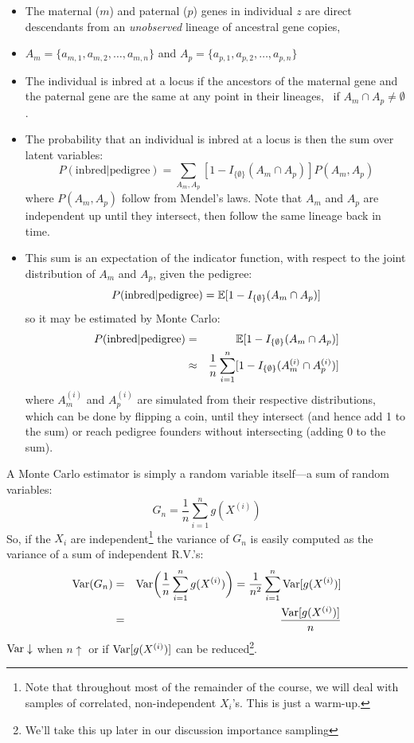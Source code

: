 \begin{itemize}
\item The maternal ($m$) and paternal ($p$) genes in individual $z$ are direct descendants from an {\em unobserved} lineage of ancestral gene copies, \ie
\item $A_m = \{a_{m,1}, a_{m,2},\ldots,a_{m,n}\}$ and $A_p = \{a_{p,1}, a_{p,2},\ldots,a_{p,n}\}$
\item The individual is inbred at a locus if the ancestors of the maternal gene and the paternal gene are the same at any point in their lineages, \ie ~if $A_m\cap A_p \neq \emptyset$.
\item The probability that an individual is inbred at a locus is then the sum over latent variables:
\[
	P(\mathrm{inbred}|\mathrm{pedigree}) = \sum_{A_m,A_p} [1-I_{\{\emptyset\}}(A_m \cap A_p )] P(A_m,A_p)
\]
where $P(A_m,A_p)$ follow from Mendel's laws.  Note that $A_m$ and $A_p$ are independent up until they intersect, then follow the same lineage back in time.
\newpage
\item This sum is an expectation of the indicator function, with respect to the joint distribution of $A_m$ and $A_p$, given the pedigree:
\[
	P(\mathrm{inbred}|\mathrm{pedigree}) = \Bbb{E} [1-I_{\{\emptyset\}}(A_m \cap A_p )] 
\]
so it may be estimated by Monte Carlo:
\begin{eqnarray}
	P(\mathrm{inbred}|\mathrm{pedigree}) & = & \Bbb{E} [1-I_{\{\emptyset\}}(A_m \cap A_p )] \nonumber \\
& \approx &
\frac{1}{n}\sum_{i=1}^n [1-I_{\{\emptyset\}}(A_m^{(i)} \cap A_p^{(i)} )] \nonumber
\end{eqnarray}
where $A_m^{(i)}$ and  $A_p^{(i)}$ are simulated from their respective distributions, which can be done by flipping a coin, until they intersect (and hence add 1 to the sum) or reach pedigree founders without intersecting (adding 0 to the sum).
\end{itemize}

A Monte Carlo estimator is simply a random variable itself---a sum of random variables:
\[
	G_n = \frac{1}{n}\sum_{i=1}^n g(X^{(i)})
\]
So, if the $X_i$ are independent\footnote{Note that throughout most of the remainder of the course, we will deal with samples of correlated, non-independent $X_i$'s.  This is just a warm-up.} the variance of $G_n$ is easily computed as the variance of a sum of independent R.V.'s:
\begin{eqnarray}
	{\mathrm{Var}}(G_n) & = & {\mathrm{Var}}\biggl(\frac{1}{n}\sum_{i=1}^n g(X^{(i)})\biggr) = \frac{1}{n^2}\sum_{i=1}^n {\mathrm{Var}}[g(X^{(i)})] \nonumber \\
	&=& \frac{{\mathrm{Var}}[g(X^{(i)})]}{n} \nonumber
\end{eqnarray}
${\mathrm{Var}} \downarrow$ when $n\uparrow$ or if ${\mathrm{Var}}[g(X^{(i)})]$ can be reduced\footnote{We'll take this up later in our discussion importance sampling}.



